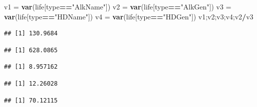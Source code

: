 \documentclass[
]{article}
\newenvironment{Shaded}{\begin{snugshade}}{\end{snugshade}}
\newcommand{\KeywordTok}[1]{\textcolor[rgb]{0.13,0.29,0.53}{\textbf{#1}}}
\newcommand{\NormalTok}[1]{#1}
\newcommand{\OperatorTok}[1]{\textcolor[rgb]{0.81,0.36,0.00}{\textbf{#1}}}
\newcommand{\StringTok}[1]{\textcolor[rgb]{0.31,0.60,0.02}{#1}}
\begin{document}
\begin{Shaded}
\begin{Highlighting}[]
\NormalTok{v1 =}\StringTok{ }\KeywordTok{var}\NormalTok{(life[type}\OperatorTok{==}\StringTok{"AlkName"}\NormalTok{])}
\NormalTok{v2 =}\StringTok{ }\KeywordTok{var}\NormalTok{(life[type}\OperatorTok{==}\StringTok{"AlkGen"}\NormalTok{])}
\NormalTok{v3 =}\StringTok{ }\KeywordTok{var}\NormalTok{(life[type}\OperatorTok{==}\StringTok{"HDName"}\NormalTok{])}
\NormalTok{v4 =}\StringTok{ }\KeywordTok{var}\NormalTok{(life[type}\OperatorTok{==}\StringTok{"HDGen"}\NormalTok{])}
\NormalTok{v1;v2;v3;v4;v2}\OperatorTok{/}\NormalTok{v3}
\end{Highlighting}
\end{Shaded}

\begin{verbatim}
## [1] 130.9684
\end{verbatim}

\begin{verbatim}
## [1] 628.0865
\end{verbatim}

\begin{verbatim}
## [1] 8.957162
\end{verbatim}

\begin{verbatim}
## [1] 12.26028
\end{verbatim}

\begin{verbatim}
## [1] 70.12115
\end{verbatim}
\end{document}
